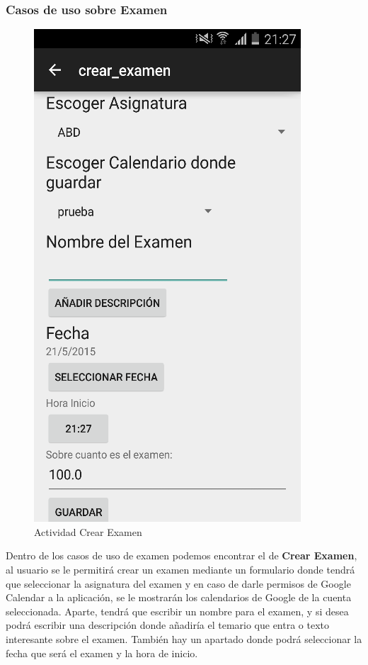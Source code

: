 \subsubsection{Casos de uso sobre Examen}
\label{subsubsecc:Casos de uso sobre Examen}
\begin{figure} 
  \begin{center}
    \includegraphics{figs/crearExamen.png}
  \end{center}
  \caption{Actividad Crear Examen}
\end{figure}
Dentro de los casos de uso de examen podemos encontrar el de \textbf{Crear Examen}, al usuario se le permitirá crear un examen mediante un formulario donde tendrá que seleccionar la asignatura del examen y en caso de darle permisos de Google Calendar a la aplicación, se le mostrarán los calendarios de Google de la cuenta seleccionada.
Aparte, tendrá que escribir un nombre para el examen,  y si desea podrá escribir una descripción donde añadiría el temario que entra o texto interesante sobre el examen.
También hay un apartado donde podrá seleccionar la fecha que será el examen y la hora de inicio.

